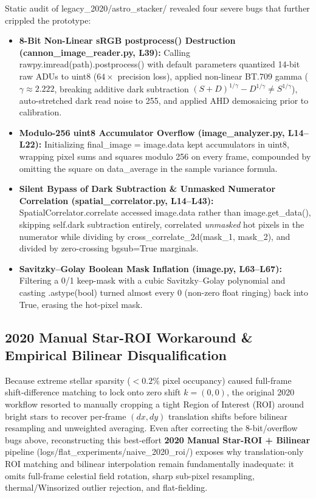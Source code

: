 \documentclass[10pt,twocolumn,letterpaper]{article}
\DeclareRobustCommand{\code}[1]{\texttt{#1}}
\def\code#1{#1}%
\def\bm#1{#1}%
\def\allowbreak{}%
\begin{document}
Static audit of \code{legacy\_2020/\allowbreak astro\_stacker/} revealed four severe bugs that further crippled the prototype:
\begin{itemize}
  \item \textbf{8-Bit Non-Linear sRGB \code{postprocess()} Destruction (\code{cannon\_\allowbreak image\_\allowbreak reader.py}, L39):} Calling \code{rawpy.\allowbreak imread(path).\allowbreak postprocess()} with default parameters quantized 14-bit raw ADUs to \code{uint8} ($64\times$ precision loss), applied non-linear BT.709 gamma ($\gamma \approx 2.222$, breaking additive dark subtraction $(S+D)^{1/\gamma} - D^{1/\gamma} \neq S^{1/\gamma}$), auto-stretched dark read noise to \code{255}, and applied AHD demosaicing prior to calibration.
  \item \textbf{Modulo-256 \code{uint8} Accumulator Overflow (\code{image\_\allowbreak analyzer.py}, L14--L22):} Initializing \code{final\_image = image.data} kept accumulators in \code{uint8}, wrapping pixel sums and squares modulo \code{256} on every frame, compounded by omitting the square on \code{data\_average} in the sample variance formula.
  \item \textbf{Silent Bypass of Dark Subtraction \& Unmasked Numerator Correlation (\code{spatial\_\allowbreak correlator.py}, L14--L43):} \code{SpatialCorrelator.\allowbreak correlate} accessed \code{image.data} rather than \code{image.get\_data()}, skipping \code{self.dark} subtraction entirely, correlated \emph{unmasked} hot pixels in the numerator while dividing by \code{cross\_correlate\_2d(mask\_1, mask\_2)}, and divided by zero-crossing \code{bgsub=True} marginals.
  \item \textbf{Savitzky--Golay Boolean Mask Inflation (\code{image.py}, L63--L67):} Filtering a \code{0/1} keep-mask with a cubic Savitzky--Golay polynomial and casting \code{.astype(bool)} turned almost every \code{0} (non-zero float ringing) back into \code{True}, erasing the hot-pixel mask.
\end{itemize}

\subsection{2020 Manual Star-ROI Workaround \& Empirical Bilinear Disqualification}

Because extreme stellar sparsity ($<0.2\%$ pixel occupancy) caused full-frame shift-difference matching to lock onto zero shift $\bm{k} = (0, 0)$, the original 2020 workflow resorted to manually cropping a tight Region of Interest (ROI) around bright stars to recover per-frame $(dx, dy)$ translation shifts before bilinear resampling and unweighted averaging. Even after correcting the 8-bit/overflow bugs above, reconstructing this best-effort \textbf{2020 Manual Star-ROI + Bilinear} pipeline (\code{logs/flat\_experiments/naive\_2020\_roi/}) exposes why translation-only ROI matching and bilinear interpolation remain fundamentally inadequate: it omits full-frame celestial field rotation, sharp sub-pixel resampling, thermal/Winsorized outlier rejection, and flat-fielding.
\end{document}
